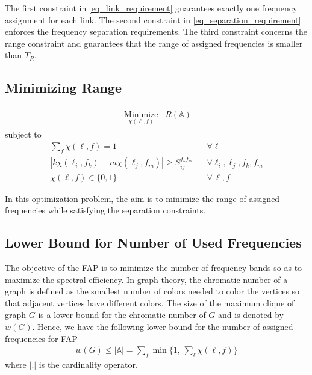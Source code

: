 \documentclass[10pt,twocolumn,twoside]{JCNtran}
\newcommand{\tbirkan}[1]{#1}
\newcommand{\linkl}{\ell}
\newcommand{\funcAssignment}[2]{\chi(#1, #2)}
\newcommand{\setUsedFreq}{\mbox{$\mathbb{A}$}}
\newcommand{\rangefa}{R}
\newcommand{\rangeConstraint}{T_{\rangefa}}
\newcommand{\freqsepQuantizedWithFreqs}[4]{S_{#1#2}^{#3#4}}
\begin{document}
The first constraint in \eqref{eq_link_requirement} guarantees exactly one frequency assignment for each link. The second constraint in \eqref{eq_separation_requirement} enforces the frequency separation requirements. The third constraint concerns the range constraint and guarantees that the range of assigned frequencies is smaller than $\rangeConstraint$.


\subsection{Minimizing Range}
\label{subsec_min_range}
\begin{align}
\begin{split}
\mathop{\mbox{Minimize}}\limits_{\funcAssignment{\linkl}{f}} \;\; \rangefa(\setUsedFreq) 
\end{split}
\end{align}
subject to
\begin{align}
\sum\limits_{f} \funcAssignment{\linkl}{f} = 1  & \;\;\; \forall \linkl \\
| k\funcAssignment{\linkl_i}{f_k} - m\funcAssignment{\linkl_j}{f_m} | \geq \freqsepQuantizedWithFreqs{i}{j}{f_k}{f_m}  & \;\;\; \forall \linkl_i, \linkl_j, f_k, f_m \\
\funcAssignment{\linkl}{f} \in \{0,1\}  &\;\;\; \forall \,\linkl, f
\end{align}


In this optimization problem, the aim is to minimize the range of assigned frequencies while satisfying the separation constraints. 

\subsection{Lower Bound for Number of Used Frequencies}
\tbirkan{
The objective of the FAP is to minimize the number of frequency bands so as to maximize the spectral efficiency. In graph theory, the chromatic number of a graph is defined as the smallest number of colors needed to color the vertices so that adjacent vertices have different colors. The size of the maximum clique of graph $G$ is a lower bound for the chromatic number of $G$ and is denoted by $w(G)$. Hence, we have the following lower bound for the number of assigned frequencies for FAP
\begin{align}
w(G) \leq |\setUsedFreq{}| = \sum\limits_{f} {\min \Big\{1, \,\sum\limits_{\linkl} \funcAssignment{\linkl}{f} \Big\}}
\end{align}
where $|.|$ is the cardinality operator.
}
\end{document}

